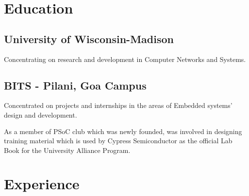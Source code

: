 \documentclass[letterpaper]{deedy-resume} %
\begin{document}
\begin{minipage}[t]{0.74\textwidth} %


\section{Education}

\subsection{University of Wisconsin-Madison}

\vspace{\topsep} %
\begin{tightitemize}
\item Concentrating on research and development in Computer Networks and Systems.
\end{tightitemize}

\sectionspace %

\subsection{BITS - Pilani, Goa Campus}

\begin{tightitemize}
\item Concentrated on projects and internships in the areas of Embedded systems' design and development.
\item As a member of PSoC club which was newly founded, was involved in designing training material which is used by Cypress Semiconductor as the official Lab Book for the University Alliance Program.
\end{tightitemize}

\sectionspace %



\section{Experience}


\end{minipage}
\end{document}

